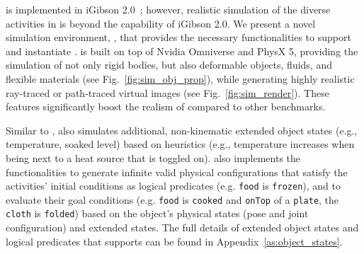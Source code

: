 \oldbenchmark is implemented in iGibson 2.0~\cite{li2021ig2}; however, realistic simulation of the diverse activities in \benchmark is beyond the capability of iGibson 2.0. We present a novel simulation environment, \simulator, that provides the necessary functionalities to support and instantiate \benchmark.
\simulator is built on top of Nvidia Omniverse and PhysX 5, providing the simulation of not only rigid bodies, but also deformable objects, fluids, and flexible materials (see Fig.~\ref{fig:sim_obj_prop}), while generating highly realistic ray-traced or path-traced virtual images (see Fig.~\ref{fig:sim_render}).
These features significantly boost the realism of \benchmark compared to other benchmarks.


Similar to \oldbenchmark, \simulator also simulates additional, non-kinematic extended object states (e.g., temperature, soaked level) based on heuristics (e.g., temperature increases when being next to a heat source that is toggled on). \simulator also implements the functionalities to generate infinite valid physical configurations that satisfy the activities' initial conditions as logical predicates (e.g. \texttt{food} is \texttt{frozen}), and to evaluate their goal conditions (e.g. \texttt{food} is \texttt{cooked} and \texttt{onTop} of a \texttt{plate}, the \texttt{cloth} is \texttt{folded}) based on the object's physical states (pose and joint configuration) and extended states.  The full details of extended object states and logical predicates that \simulator supports can be found in Appendix~\ref{as:object_states}. 


